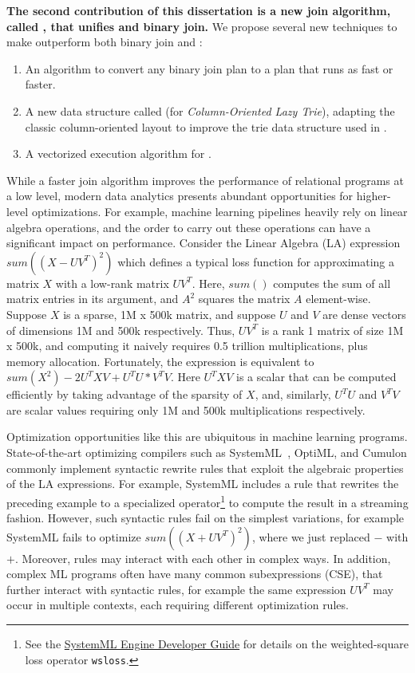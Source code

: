 \textbf{
The second contribution of this dissertation is a new join algorithm,
  called \FJ, that unifies \WCOJ and binary join.}
We propose several new techniques to make \FJ outperform
both binary join and \WCOJ:
\begin{enumerate}
\item An algorithm to convert any binary join plan to a \FJ
  plan that runs as fast or faster.
\item A new data structure called
\COLT (for \emph{Column-Oriented Lazy Trie}), adapting the classic
column-oriented layout to improve the trie data structure used in
\WCOJ.
\item A vectorized execution algorithm for \FJ.
\end{enumerate}

While a faster join algorithm improves the performance of 
 relational programs at a low level,
 modern data analytics presents abundant opportunities
 for higher-level optimizations.
For example, machine learning pipelines heavily rely on 
 linear algebra operations,
 and the order to carry out these operations
 can have a significant impact on performance.
Consider the Linear Algebra (LA) expression $sum((X-UV^T)^2)$ which
defines a typical loss function for approximating a matrix $X$ with a
low-rank matrix $UV^T$. Here, $sum()$ computes the sum of all matrix
entries in its argument, and $A^2$ squares the matrix $A$
element-wise. Suppose $X$ is a sparse, 1M x 500k matrix, and suppose
$U$ and $V$ are dense vectors of dimensions 1M and 500k respectively.
Thus, $UV^T$ is a rank 1 matrix of size 1M x 500k, and computing it
naively requires 0.5 trillion multiplications, plus memory allocation.
Fortunately, the expression is equivalent to
$sum(X^2) - 2U^TXV + U^TU * V^TV$.  Here $U^TXV$ is a scalar that can
be computed efficiently by taking advantage of the sparsity of $X$,
and, similarly, $U^TU$ and $V^TV$ are scalar values requiring only 1M
and 500k multiplications respectively.

Optimization opportunities like this are ubiquitous in machine
learning programs. State-of-the-art optimizing compilers such as
SystemML~\cite{DBLP:reference/bdt/Boehm19},
OptiML\cite{DBLP:conf/icml/SujeethLBRCWAOO11}, and
Cumulon\cite{DBLP:conf/sigmod/HuangB013} commonly implement syntactic
rewrite rules that exploit the algebraic properties of the LA
expressions. For example, SystemML includes a rule that rewrites the
preceding example to a specialized operator\footnote{See the
  \href{https://systemml.apache.org/docs/0.12.0/engine-dev-guide.html}{SystemML
    Engine Developer Guide} for details on the weighted-square loss
  operator \texttt{wsloss}. } to compute the result in a streaming
fashion.  However, such syntactic rules fail on the simplest
variations, for example SystemML fails to optimize $sum((X+UV^T)^2)$,
where we just replaced $-$ with $+$.  Moreover, rules may interact
with each other in complex ways.  In addition, complex ML programs
often have many common subexpressions (CSE), that further interact
with syntactic rules, for example the same expression $UV^T$ may occur
in multiple contexts, each requiring different optimization rules.


